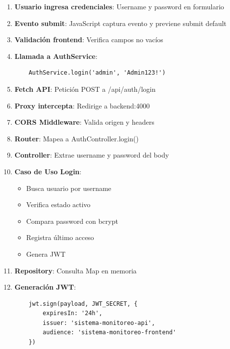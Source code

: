 \documentclass[12pt,a4paper]{article}
\begin{document}
\begin{enumerate}[leftmargin=*]
    \item \textbf{Usuario ingresa credenciales}: Username y password en formulario

    \item \textbf{Evento submit}: JavaScript captura evento y previene submit default

    \item \textbf{Validación frontend}: Verifica campos no vacíos

    \item \textbf{Llamada a AuthService}:
    \begin{verbatim}
    AuthService.login('admin', 'Admin123!')
    \end{verbatim}

    \item \textbf{Fetch API}: Petición POST a /api/auth/login

    \item \textbf{Proxy intercepta}: Redirige a backend:4000

    \item \textbf{CORS Middleware}: Valida origen y headers

    \item \textbf{Router}: Mapea a AuthController.login()

    \item \textbf{Controller}: Extrae username y password del body

    \item \textbf{Caso de Uso Login}:
    \begin{itemize}
        \item Busca usuario por username
        \item Verifica estado activo
        \item Compara password con bcrypt
        \item Registra último acceso
        \item Genera JWT
    \end{itemize}

    \item \textbf{Repository}: Consulta Map en memoria

    \item \textbf{Generación JWT}:
    \begin{verbatim}
    jwt.sign(payload, JWT_SECRET, {
        expiresIn: '24h',
        issuer: 'sistema-monitoreo-api',
        audience: 'sistema-monitoreo-frontend'
    })
    \end{verbatim}


\end{enumerate}
\end{document}
